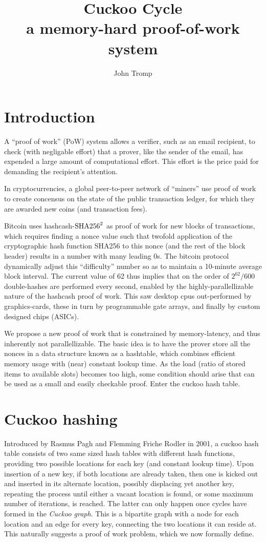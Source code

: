 \documentclass[11pt, oneside]{article}
\title{Cuckoo Cycle \protect\\ a memory-hard proof-of-work system}
\author{John Tromp}
\newcommand{\sha}{{\rm SHA256}}
\begin{document}
\maketitle
\section{Introduction}
A ``proof of work'' (PoW) system allows a verifier, such as an email recipient,
to check (with negligable effort) that a prover, like the sender of the email,
has expended a large amount of computational effort.
This effort is the price paid for demanding the recipient's attention.

In cryptocurrencies, a global peer-to-peer network of ``miners'' use proof of
work to create concensus on the state of the public transaction ledger, for
which they are awarded new coins (and transaction fees). 

Bitcoin\cite{nakamoto2009bitcoin} uses hashcash-${\sha}^2$ as proof of work for
new blocks of transactions, which requires finding a nonce value such that
twofold application of the cryptographic hash function SHA256
to this nonce (and the rest of the block header) results in a number with many
leading 0s.  The bitcoin protocol dynamically adjust this ``difficulty'' number
so as to maintain a 10-minute average block interval. The current value of 62
thus implies that on the order of $2^{62}/600$ double-hashes
are performed every second, enabled by the highly-parallellizable nature of the
hashcash proof of work.  This saw desktop cpus out-performed by graphics-cards,
these in turn by programmable gate arrays,
and finally by custom designed chips (ASICs).

We propose a new proof of work that is constrained by memory-latency, and thus
inherently not parallellizable. The basic idea is to have the prover store all
the nonces in a data structure
known as a hashtable, which combines efficient memory usage with (near) constant
lookup time. As the load (ratio of stored items to available slots) becomes
too high, some condition should arise
that can be used as a small and easily checkable proof.   Enter the cuckoo hash
table.

\section{Cuckoo hashing}
Introduced by Rasmus Pagh and Flemming Friche Rodler in
2001\cite{Pagh01cuckoohashing}, a cuckoo hash table consists of two same sized
hash tables with different hash functions,
providing two possible locations for each key (and constant lookup time).
Upon insertion of a new key, if both locations are already taken,
then one is kicked out and inserted in its alternate location, possibly
displacing yet another key, repeating the process until either a vacant
location is found, or some maximum number of iterations,
is reached. The latter can only happen once cycles have formed in the {\em
Cuckoo graph}.  This is a bipartite graph with a node for each location and an
edge for every key,
connecting the two locations it can reside at. This naturally suggests a proof
of work problem, which we now formally define.
\end{document}
